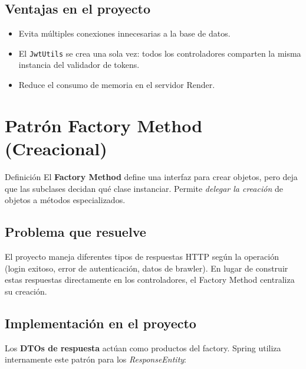 \documentclass[12pt,a4paper]{article}
\begin{document}
\subsection{Ventajas en el proyecto}
\begin{itemize}
  \item Evita m\'ultiples conexiones innecesarias a la base de datos.
  \item El \texttt{JwtUtils} se crea una sola vez: todos los controladores comparten la misma instancia del validador de tokens.
  \item Reduce el consumo de memoria en el servidor Render.
\end{itemize}

\newpage
\section{Patr\'on Factory Method (Creacional)}

\begin{patronbox}{Definici\'on}
El \textbf{Factory Method} define una interfaz para crear objetos, pero deja que las subclases decidan qu\'e clase instanciar. Permite \textit{delegar la creaci\'on} de objetos a m\'etodos especializados.
\end{patronbox}

\subsection{Problema que resuelve}

El proyecto maneja diferentes tipos de respuestas HTTP seg\'un la operaci\'on (login exitoso, error de autenticaci\'on, datos de brawler). En lugar de construir estas respuestas directamente en los controladores, el Factory Method centraliza su creaci\'on.

\subsection{Implementaci\'on en el proyecto}

Los \textbf{DTOs de respuesta} actúan como productos del factory. Spring utiliza internamente este patr\'on para los \textit{ResponseEntity}:
\end{document}
